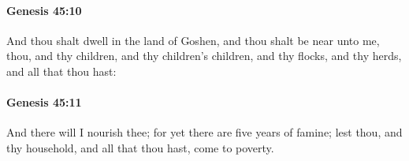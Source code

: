		\paragraph{Genesis 45:10} %
			\label{GENESIS-45-10}

			And thou shalt dwell in the land of Goshen, and thou shalt be near unto me, thou, and thy children, and thy children's children, and thy flocks, and thy herds, and all that thou hast:


		\paragraph{Genesis 45:11} %
			\label{GENESIS-45-11}

			And there will I nourish thee; for yet there are five years of famine; lest thou, and thy household, and all that thou hast, come to poverty.


